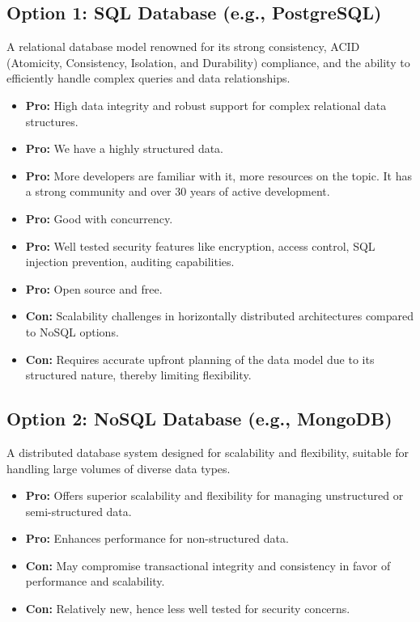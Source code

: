 \subsection*{Option 1: SQL Database (e.g., PostgreSQL)}
A relational database model renowned for its strong consistency, ACID (Atomicity, Consistency, Isolation, and Durability) compliance, and the ability to efficiently handle complex queries and data relationships.
\begin{itemize}
    \item \textbf{Pro:} High data integrity and robust support for complex relational data structures.
    \item \textbf{Pro:} We have a highly structured data.
    \item \textbf{Pro:} More developers are familiar with it, more resources on the topic. It has a strong community and over 30 years of active development.
    \item \textbf{Pro:} Good with concurrency.
    \item \textbf{Pro:} Well tested security features like encryption, access control, SQL injection prevention, auditing capabilities.
    \item \textbf{Pro:} Open source and free.
    \item \textbf{Con:} Scalability challenges in horizontally distributed architectures compared to NoSQL options.
    \item \textbf{Con:} Requires accurate upfront planning of the data model due to its structured nature, thereby limiting flexibility.
\end{itemize}

\subsection*{Option 2: NoSQL Database (e.g., MongoDB)}
A distributed database system designed for scalability and flexibility, suitable for handling large volumes of diverse data types.
\begin{itemize}
    \item \textbf{Pro:} Offers superior scalability and flexibility for managing unstructured or semi-structured data.
    \item \textbf{Pro:} Enhances performance for non-structured data.
    \item \textbf{Con:} May compromise transactional integrity and consistency in favor of performance and scalability.
    \item \textbf{Con:} Relatively new, hence less well tested for security concerns.
\end{itemize}

